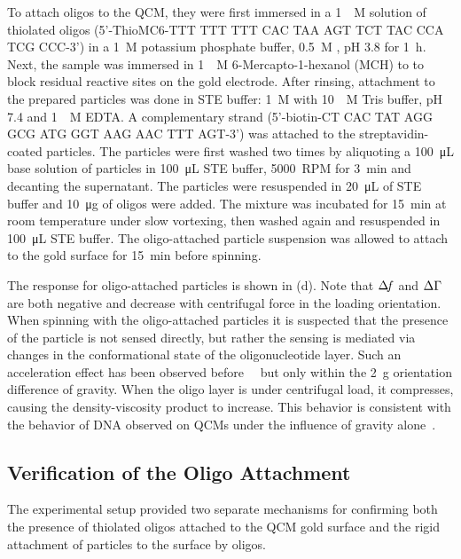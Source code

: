 To attach oligos to the QCM, they were first immersed in a
\SI{1}{\micro\textsc{M}} solution of thiolated oligos (5'-ThioMC6-TTT TTT
TTT CAC TAA AGT TCT TAC CCA TCG CCC-3') in a \SI{1}{\textsc{M}} potassium
phosphate buffer, \SI{0.5}{\textsc{M}} , pH 3.8 for
\SI{1}{\hour}.  Next, the sample was immersed in \SI{1}{\milli\textsc{M}}
6-Mercapto-1-hexanol (MCH) to to block residual reactive sites on the
gold electrode.  After rinsing, attachment to the prepared particles was
done in STE buffer: \SI{1}{\textsc{M}}  with
\SI{10}{\milli\textsc{M}} Tris buffer, pH 7.4 and \SI{1}{\milli\textsc{M}}
EDTA\@.  A complementary strand (5'-biotin-CT CAC TAT AGG GCG ATG GGT AAG
AAC TTT AGT-3') was attached to the streptavidin-coated particles.  The
particles were first washed two times by aliquoting a
\SI{100}{\micro\liter} base solution of particles in \SI{100}{\micro\liter}
STE buffer, \SI{5000}{RPM} for \SI{3}{\minute} and decanting the
supernatant.  The particles were resuspended in \SI{20}{\micro\liter} of
STE buffer and \SI{10}{\micro\gram} of oligos were added.  The mixture was
incubated for \SI{15}{\minute} at room temperature under slow vortexing,
then washed again and resuspended in \SI{100}{\micro\liter} STE buffer.
The oligo-attached particle suspension was allowed to attach to the gold
surface for \SI{15}{\minute} before spinning.

The response for oligo-attached particles is shown in
(d).  Note that $\Delta\!f$ and $\Delta\Gamma$ are both negative and
decrease with centrifugal force in the loading orientation.  When spinning
with the oligo-attached particles it is suspected that the presence of the
particle is not sensed directly, but rather the sensing is mediated via
changes in the conformational state of the oligonucleotide layer.  Such an
acceleration effect has been observed
before~\cite{yoshimoto2002effect}~\cite{fawcett2004evidence} but only within
the \SI{2}{g} orientation difference of gravity.  When the oligo layer is
under centrifugal load, it compresses, causing the density-viscosity product
to increase.  This behavior is consistent with the behavior of DNA observed on
QCMs under the influence of gravity alone~\cite{fawcett2004evidence}.

\subsection{Verification of the Oligo Attachment}
The experimental setup provided two separate mechanisms for confirming both
the presence of thiolated oligos attached to the QCM gold surface and the
rigid attachment of particles to the surface by oligos.

